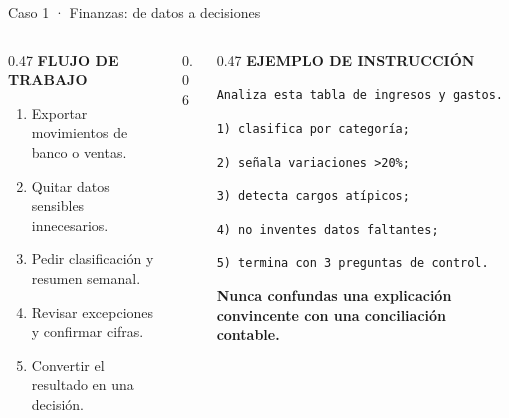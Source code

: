 \documentclass[aspectratio=169,11pt]{beamer}
\newcommand{\kicker}[1]{{\color{gold}\scriptsize\bfseries\MakeUppercase{#1}}}
\newcommand{\prompt}[1]{\texttt{\small #1}}
\begin{document}
\begin{frame}{Caso 1 · Finanzas: de datos a decisiones}
\begin{columns}[T,onlytextwidth]
\begin{column}{0.47\textwidth}
\kicker{Flujo de trabajo}\par\vspace{0.25cm}
\begin{enumerate}
\item Exportar movimientos de banco o ventas.
\item Quitar datos sensibles innecesarios.
\item Pedir clasificación y resumen semanal.
\item Revisar excepciones y confirmar cifras.
\item Convertir el resultado en una decisión.
\end{enumerate}
\end{column}
\begin{column}{0.06\textwidth}
\centering{\color{soft}\rule{0.6pt}{5.2cm}}
\end{column}
\begin{column}{0.47\textwidth}
\kicker{Ejemplo de instrucción}\par\vspace{0.25cm}
\prompt{Analiza esta tabla de ingresos y gastos.}\par
\prompt{1) clasifica por categoría;}\par
\prompt{2) señala variaciones >20\%;}\par
\prompt{3) detecta cargos atípicos;}\par
\prompt{4) no inventes datos faltantes;}\par
\prompt{5) termina con 3 preguntas de control.}
\vspace{0.40cm}

{\small\color{rust}\bfseries Nunca confundas una explicación convincente con una conciliación contable.}
\end{column}
\end{columns}
\end{frame}
\end{document}
